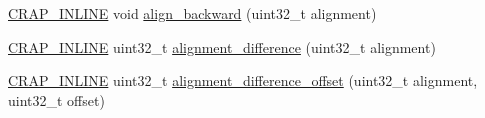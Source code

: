 \begin{DoxyCompactItemize}
\item 
\hyperlink{config__x86_8h_a5a40526b8d842e7ff731509998bb0f1c}{C\+R\+A\+P\+\_\+\+I\+N\+L\+I\+N\+E} void \hyperlink{structcrap_1_1pointer__t_a20af2bc4a6a7a4a80522b4ab247fb006}{align\+\_\+backward} (uint32\+\_\+t alignment)
\item 
\hyperlink{config__x86_8h_a5a40526b8d842e7ff731509998bb0f1c}{C\+R\+A\+P\+\_\+\+I\+N\+L\+I\+N\+E} uint32\+\_\+t \hyperlink{structcrap_1_1pointer__t_a7c1820d700423029c30a45c144242d6e}{alignment\+\_\+difference} (uint32\+\_\+t alignment)
\item 
\hyperlink{config__x86_8h_a5a40526b8d842e7ff731509998bb0f1c}{C\+R\+A\+P\+\_\+\+I\+N\+L\+I\+N\+E} uint32\+\_\+t \hyperlink{structcrap_1_1pointer__t_a2f97224de2956dd947fe10521a76558c}{alignment\+\_\+difference\+\_\+offset} (uint32\+\_\+t alignment, uint32\+\_\+t offset)
\end{DoxyCompactItemize}
